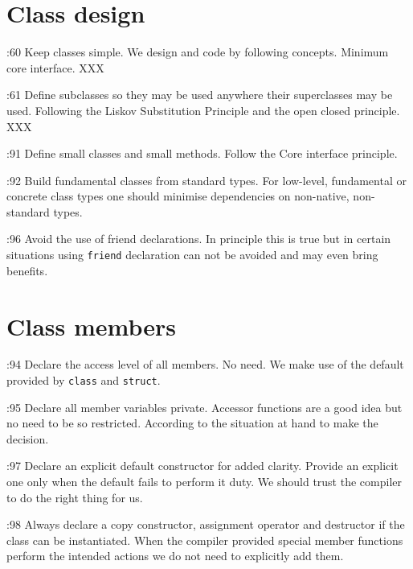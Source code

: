 \documentclass{book}
\newcommand{\name}[1]{\texttt{#1}}
\begin{document}
\section{Class design}
\label{sec:ClassDesign}

\cite{OKL_MisfeldtBumgardnerGray2004CppStyle}:60 Keep classes simple. We design and code by following concepts. Minimum core interface. XXX

\cite{OKL_MisfeldtBumgardnerGray2004CppStyle}:61 Define subclasses so they may be used anywhere their superclasses may be used. Following the Liskov Substitution Principle and the open closed principle. XXX

\cite{OKL_MisfeldtBumgardnerGray2004CppStyle}:91 Define small classes and small methods. Follow the Core interface principle.

\cite{OKL_MisfeldtBumgardnerGray2004CppStyle}:92 Build fundamental classes from standard types. For low-level, fundamental or concrete class types one should minimise dependencies on non-native, non-standard types.

\cite{OKL_MisfeldtBumgardnerGray2004CppStyle}:96 Avoid the use of friend declarations. In principle this  is true but in certain situations using \name{friend} declaration can not be avoided and may even bring benefits. 






\section{Class members}
\label{sec:ClassMembers}

\cite{OKL_MisfeldtBumgardnerGray2004CppStyle}:94 Declare the access level of all members. No need. We make use of the default provided by \name{class} and \name{struct}. 

\cite{OKL_MisfeldtBumgardnerGray2004CppStyle}:95 Declare all member variables private. Accessor functions are a good idea but no need to be so restricted. According to the situation at hand to make the decision.

\cite{OKL_MisfeldtBumgardnerGray2004CppStyle}:97 Declare an explicit default constructor for added clarity. Provide an explicit one only when the default fails to perform it duty. We should trust the compiler to do the right thing for us.

\cite{OKL_MisfeldtBumgardnerGray2004CppStyle}:98 Always declare a copy constructor, assignment operator and destructor if the class can be instantiated. When the compiler provided special member functions perform the intended actions we do not need to explicitly add them. 
\end{document}
